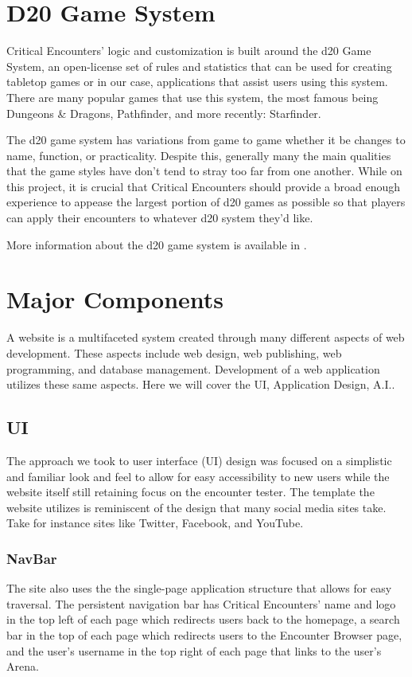 \documentclass[letterpaper, 10 pt, conference]{ieeeconf}
\begin{document}
\section{D20 Game System}
Critical Encounters' logic and customization is built around the d20 Game System, an open-license set of rules and statistics that can be used for creating tabletop games or in our case, applications that assist users using this system. There are many popular games that use this system, the most famous being Dungeons \& Dragons, Pathfinder, and more recently: Starfinder. \par
The d20 game system has variations from game to game whether it be changes
to name, function, or practicality. Despite this, generally many the main qualities
that the game styles have don’t tend to stray too far from one another. While on
this project, it is crucial that Critical Encounters should provide a broad enough
experience to appease the largest portion of d20 games as possible so that players
can apply their encounters to whatever d20 system they’d like. \par
More information about the d20 game system is available in \cite{c4}.

\section{Major Components}
A website is a multifaceted system created through many different aspects of web development. These aspects include web design, web publishing, web programming, and database management. Development of a web application utilizes these same aspects. Here we will cover the UI, Application Design, A.I..
\subsection{UI}
The approach we took to user interface (UI) design was focused on a simplistic
and familiar look and feel to allow for easy accessibility to new users while the
website itself still retaining focus on the encounter tester. The template the website
utilizes is reminiscent of the design that many social media sites take. Take for
instance sites like Twitter, Facebook, and YouTube.
\subsubsection{NavBar}
The site also uses the the single-page application structure that allows for easy
traversal. The persistent navigation bar has Critical Encounters’
name and logo in the top left of each page which redirects users back to the homepage,
a search bar in the top of each page which redirects users to the Encounter
Browser page, and the user’s username in the top right of each page that links to
the user’s Arena.
\end{document}
